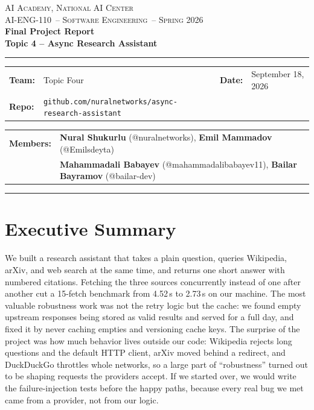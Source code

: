 \documentclass[11pt,a4paper]{article}
\newcommand{\teamname}{Topic Four}
\newcommand{\topicchoice}{Topic 4 -- Async Research Assistant}
\newcommand{\member}[2]{\textbf{#1} (#2)}
\newcommand{\reportdate}{September 18, 2026}
\newcommand{\repolink}{\texttt{github.com/nuralnetworks/async-research-assistant}}
\newcommand{\coursecode}{AI-ENG-110}
\newcommand{\coursename}{Software Engineering}
\newcommand{\institution}{AI Academy, National AI Center}
\newcommand{\semester}{Spring 2026}
\begin{document}
\begin{center}
{\small \textsc{\institution} \\[0.2em] \textsc{\coursecode\ -- \coursename\ -- \semester}}\\[1.2em]
{\Large\bfseries\color{accent} Final Project Report}\\[0.3em]
{\LARGE\bfseries \topicchoice}\\[0.6em]
\rule{0.85\textwidth}{0.6pt}
\end{center}

\vspace{0.6em}
\begin{tabularx}{\textwidth}{@{}lXlX@{}}
\textbf{Team:} & \teamname & \textbf{Date:} & \reportdate \\
\textbf{Repo:} & \repolink \\
\end{tabularx}

\noindent\begin{tabularx}{\textwidth}{@{}lX@{}}
\textbf{Members:} & \member{Nural Shukurlu}{@nuralnetworks},\quad
  \member{Emil Mammadov}{@Emilsdeyta} \\
 & \member{Mahammadali Babayev}{@mahammadalibabayev11},\quad
  \member{Bailar Bayramov}{@bailar-dev} \\
\end{tabularx}
\vspace{0.4em}\hrule\vspace{0.6em}

\section*{Executive Summary}

We built a research assistant that takes a plain question, queries Wikipedia, arXiv, and web search at the same time, and returns one short answer with numbered citations. Fetching the three sources concurrently instead of one after another cut a 15-fetch benchmark from 4.52\,s to 2.73\,s on our machine. The most valuable robustness work was not the retry logic but the cache: we found empty upstream responses being stored as valid results and served for a full day, and fixed it by never caching empties and versioning cache keys. The surprise of the project was how much behavior lives outside our code: Wikipedia rejects long questions and the default HTTP client, arXiv moved behind a redirect, and DuckDuckGo throttles whole networks, so a large part of ``robustness'' turned out to be shaping requests the providers accept. If we started over, we would write the failure-injection tests before the happy paths, because every real bug we met came from a provider, not from our logic.
\end{document}

